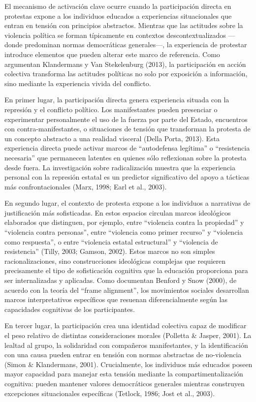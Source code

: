 \documentclass[
  13pt,
]{article}
\begin{document}
El mecanismo de activación clave ocurre cuando la participación directa
en protestas expone a los individuos educados a experiencias
situacionales que entran en tensión con principios abstractos. Mientras
que las actitudes sobre la violencia política se forman típicamente en
contextos descontextualizados ---donde predominan normas democráticas
generales---, la experiencia de protestar introduce elementos que pueden
alterar este marco de referencia. Como argumentan Klandermans y Van
Stekelenburg (2013), la participación en acción colectiva transforma las
actitudes políticas no solo por exposición a información, sino mediante
la experiencia vivida del conflicto.

En primer lugar, la participación directa genera experiencia situada con
la represión y el conflicto político. Los manifestantes pueden
presenciar o experimentar personalmente el uso de la fuerza por parte
del Estado, encuentros con contra-manifestantes, o situaciones de
tensión que transforman la protesta de un concepto abstracto a una
realidad visceral (Della Porta, 2013). Esta experiencia directa puede
activar marcos de ``autodefensa legítima'' o ``resistencia necesaria''
que permanecen latentes en quienes sólo reflexionan sobre la protesta
desde fuera. La investigación sobre radicalización muestra que la
experiencia personal con la represión estatal es un predictor
significativo del apoyo a tácticas más confrontacionales (Marx, 1998;
Earl et al., 2003).

En segundo lugar, el contexto de protesta expone a los individuos a
narrativas de justificación más sofisticadas. En estos espacios circulan
marcos ideológicos elaborados que distinguen, por ejemplo, entre
``violencia contra la propiedad'' y ``violencia contra personas'', entre
``violencia como primer recurso'' y ``violencia como respuesta'', o
entre ``violencia estatal estructural'' y ``violencia de resistencia''
(Tilly, 2003; Gamson, 2002). Estos marcos no son simples
racionalizaciones, sino construcciones ideológicas complejas que
requieren precisamente el tipo de sofisticación cognitiva que la
educación proporciona para ser internalizadas y aplicadas. Como
documentan Benford y Snow (2000), de acuerdo con la teoría del ``frame
alignment'', los movimientos sociales desarrollan marcos interpretativos
específicos que resuenan diferencialmente según las capacidades
cognitivas de los participantes.

En tercer lugar, la participación crea una identidad colectiva capaz de
modificar el peso relativo de distintas consideraciones morales
(Polletta \& Jasper, 2001). La lealtad al grupo, la solidaridad con
compañeros manifestantes, y la identificación con una causa pueden
entrar en tensión con normas abstractas de no-violencia (Simon \&
Klandermans, 2001). Crucialmente, los individuos más educados poseen
mayor capacidad para manejar esta tensión mediante la
compartimentalización cognitiva: pueden mantener valores democráticos
generales mientras construyen excepciones situacionales específicas
(Tetlock, 1986; Jost et al., 2003).
\end{document}
